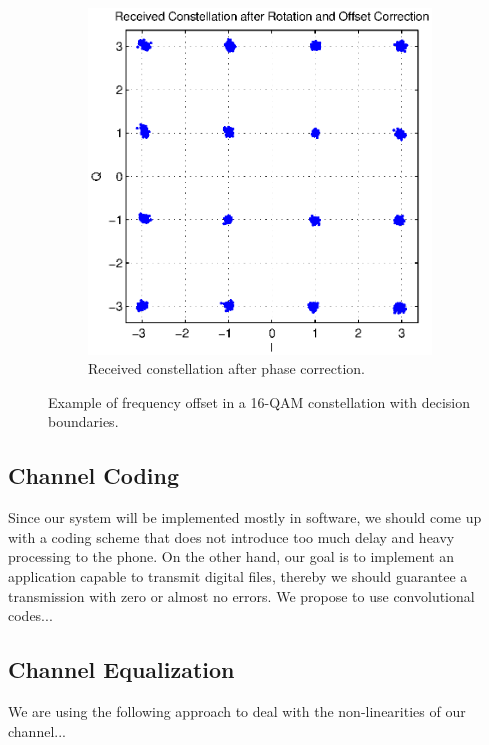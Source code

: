 \documentclass[12pt,a4paper,openright]{article}
\begin{document}
\begin{figure}[h]
    \begin{subfigure}{0.32\textwidth}
 \centering
    \includegraphics[width=0.8\linewidth]{rx_const_after.eps}
    \caption{Received constellation after phase correction.}
    \label{fig:PD3}
    \end{subfigure}
    \caption{Example of frequency offset in a 16-QAM constellation with decision boundaries.  }
    \label{fig:phaseoff}
\end{figure}


\clearpage


\subsection{Channel Coding}
Since our system will be implemented mostly in software, we should come up with a coding scheme that does not introduce too much delay and heavy processing to the phone. On the other hand, our goal is to implement an application capable to transmit digital files, thereby we should guarantee a transmission with zero or almost no errors.
We propose to use convolutional codes...


\subsection{Channel Equalization}
We are using the following approach to deal with the non-linearities of our channel...
\end{document}
